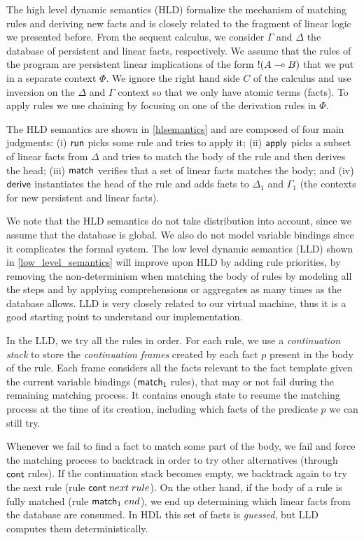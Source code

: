 The high level dynamic semantics (HLD) formalize the mechanism of matching rules and deriving new facts and is closely related to the fragment of linear logic we presented before.
From the sequent calculus, we consider $\Gamma$ and $\Delta$ the database of persistent and linear facts, respectively.
We assume that the rules of the program are persistent linear implications of the form ${!} (A \multimap B)$ that we put in a separate context $\Phi$.
We ignore the right hand side $C$ of the calculus and use inversion on the $\Delta$ and $\Gamma$ context so that we only have atomic terms (facts). To apply rules
we use chaining by focusing on one of the derivation rules in $\Phi$.

The HLD semantics are shown in \ref{hlsemantics} and are composed of four main judgments: (i) $\mathsf{run}$ picks some rule and tries to apply it;
(ii) $\mathsf{apply}$ picks a subset of linear facts from $\Delta$ and tries to match the body of the rule and then derives the head; (iii) $\mathsf{match}$
verifies that a set of linear facts matches the body; and (iv) $\mathsf{derive}$ instantiates the head of the rule and adds facts to $\Delta_1$ and $\Gamma_1$
(the contexts for new persistent and linear facts).

We note that the HLD semantics do not take distribution into account, since we assume that the database is global. We also do not model variable bindings
since it complicates the formal system. The low level dynamic semantics (LLD) shown in \ref{low_level_semantics} will improve upon HLD by adding rule priorities, by removing the non-determinism
when matching the body of rules by modeling all the steps and by applying comprehensions or aggregates as many times as the database allows.
LLD is very closely related to our virtual machine, thus it is a good starting point to understand our implementation.

In the LLD, we try all the rules in order. For each rule, we use a \emph{continuation stack} to store the \emph{continuation frames} created by each fact $p$ present
in the body of the rule. Each frame considers all the facts relevant to the fact template given the current variable bindings ($\mathsf{match}_1 \;$rules), that may or not fail during the
remaining matching process. It contains enough state to resume the matching process at the time of its creation, including which facts of the predicate $p$
we can still try.

Whenever we fail to find a fact to match some part of the body, we fail and force the matching process to backtrack in order to try other alternatives (through $\mathsf{cont} \;$rules).
If the continuation stack becomes empty, we backtrack again to try the next rule (rule $\mathsf{cont} \; next \; rule$). On the other hand, if the body of a rule is fully matched (rule $\mathsf{match}_1 \; end$),
we end up determining which linear facts from the database are consumed. In HDL this set of facts is \emph{guessed}, but LLD computes them deterministically.

